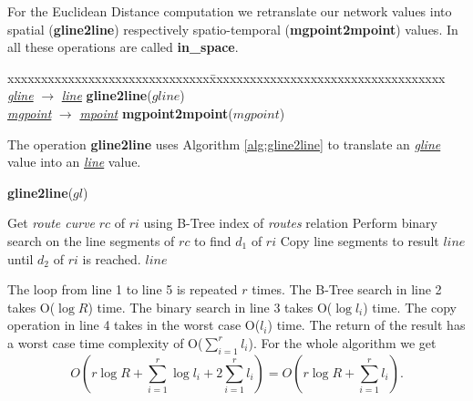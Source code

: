 \documentclass[a4paper]{article}
\newcommand{\op}[1]{\textbf{#1}}
\newcommand{\dt}[1]{\textsl{\underline{#1}}}
\begin{document}
For the Euclidean Distance computation we retranslate our network values into
spatial (\op{gline2line}) respectively spatio-temporal (\op{mgpoint2mpoint})
values. In \cite{NetworkGueting} all these operations are called \op{in\_space}.
\begin{tabbing}
xxxxxxxxxxxxxxxxxxxxxxxxxxxxxx\=xxxxxxxxxxxxxxxxxxxxxxxxxxxxxxxxxxx\kill
\dt{gline} $\rightarrow$ \dt{line} \> \op{gline2line}($gline$) \\
\dt{mgpoint} $\rightarrow$ \dt{mpoint} \> \op{mgpoint2mpoint}($mgpoint$)\\
\end{tabbing}
The operation \op{gline2line} uses Algorithm \ref{alg:gline2line} to
translate an \dt{gline} value into an \dt{line} value.
\begin{algorithm}[H]
  \caption{\op{gline2line}($gl$)}
  \label{alg:gline2line}
  \begin{algorithmic}[1]
      \STATE Get \textit{route curve} $rc$ of $ri$ using
B-Tree index of \textit{routes} relation
      \STATE Perform binary search on the line segments of $rc$ to find $d_1$ of
$ri$
      \STATE Copy line segments to result $line$ until $d_2$ of $ri$ is reached.
    \ENDFOR
    \RETURN $line$
  \end{algorithmic}
\end{algorithm}
The loop from line 1 to
line 5 is repeated $r$ times. The B-Tree search in line 2 takes O($\log{R}$)
time. The binary search in line 3 takes O($\log l_i$) time. The copy operation
in line 4 takes in the worst case O($l_i$) time. The return of
the result has a worst case time complexity of O($\sum_{i=1}^{r}{l_i}$). For the
whole algorithm we
get
\[O(r \log{R} + \sum_{i=1}^{r}{\log{l_i}} + 2\sum_{i=1}^{r}{l_i})
= O(r \log{R} + \sum_{i=1}^{r}{l_i}).\]
\end{document}
